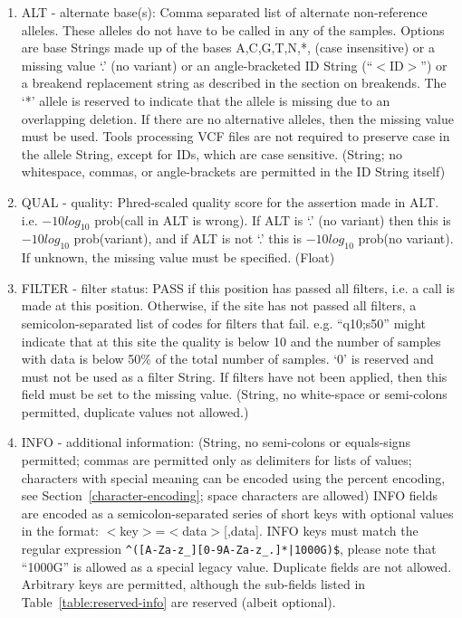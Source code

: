 \documentclass[8pt]{article}
\begin{document}
\begin{enumerate}
  \item ALT - alternate base(s): Comma separated list of alternate non-reference alleles.  These alleles do not have to be called in any of the samples. Options are base Strings made up of the bases A,C,G,T,N,*, (case insensitive) or a missing value `.' (no variant) or an angle-bracketed ID String (``$<$ID$>$'') or a breakend replacement string as described in the section on breakends. The `*' allele is reserved to indicate that the allele is missing due to an overlapping deletion. If there are no alternative alleles, then the missing value must be used.  Tools processing VCF files are not required to preserve case in the allele String, except for IDs, which are case sensitive.  (String; no whitespace, commas, or angle-brackets are permitted in the ID String itself)
  \item QUAL - quality: Phred-scaled quality score for the assertion made in ALT. i.e. $-10log_{10}$ prob(call in ALT is wrong). If ALT is `.' (no variant) then this is $-10log_{10}$ prob(variant), and if ALT is not `.' this is $-10log_{10}$ prob(no variant). If unknown, the missing value must be specified. (Float)
  \item FILTER - filter status: PASS if this position has passed all filters, i.e. a call is made at this position. Otherwise, if the site has not passed all filters, a semicolon-separated list of codes for filters that fail. e.g. ``q10;s50'' might indicate that at this site the quality is below 10 and the number of samples with data is below 50\% of the total number of samples. `0' is reserved and must not be used as a filter String. If filters have not been applied, then this field must be set to the missing value. (String, no white-space or semi-colons permitted, duplicate values not allowed.)
  \item INFO - additional information: (String, no semi-colons or equals-signs permitted; commas are permitted only as delimiters for lists of
  values; characters with special meaning can be encoded using the percent encoding, see Section~\ref{character-encoding}; space characters are allowed)
  INFO fields are encoded as a semicolon-separated series of short keys with optional values in the format: $<$key$>$=$<$data$>$[,data].
  INFO keys must match the regular expression \texttt{\^{}([A-Za-z\_][0-9A-Za-z\_.]*|1000G)\$}, please note that ``1000G'' is allowed as a special legacy value. Duplicate fields are not allowed. Arbitrary keys are permitted, although the sub-fields listed in Table~\ref{table:reserved-info} are reserved (albeit optional).


\end{enumerate}
\end{document}
